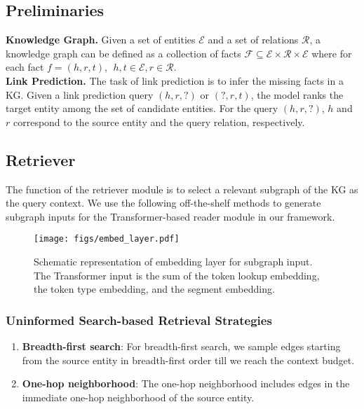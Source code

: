 \subsection{Preliminaries}
\noindent \textbf{Knowledge Graph.} Given a set of entities $\mathcal{E}$ and a set of relations $\mathcal{R}$, a knowledge graph can be defined as a collection of facts $\mathcal{F} \subseteq \mathcal{E} \times \mathcal{R} \times \mathcal{E}$ where for each fact $f = (h, r, t)$, $\;h,t \in \mathcal{E}, r \in \mathcal{R}$.\\

\noindent \textbf{Link Prediction.} The task of link prediction is to infer the missing facts in a KG\@. Given a link prediction query $(h, r, ?)$ or $(?, r, t)$, the model ranks the target entity among the set of candidate entities. For the query $(h, r, ?)$, $h$ and $r$ correspond to the source entity and the query relation, respectively.
\subsection{Retriever}
The function of the retriever module is to select a relevant subgraph of the KG as the query context.
We use the following off-the-shelf methods to generate subgraph inputs for the Transformer-based reader module in our framework.

\begin{figure*}[htbp]
  \centering
  \texttt{[image: figs/embed\_layer.pdf]}
  \caption{Schematic representation of embedding layer for subgraph input. The Transformer input is the sum of the token lookup embedding, the token type embedding, and the segment embedding.}
  \label{fig:model_embed}
\end{figure*}

\subsubsection{Uninformed Search-based Retrieval Strategies}
\begin{enumerate}[label=\alph*)]
\item\textbf{Breadth-first search}: For breadth-first search, we sample edges starting from the source entity in breadth-first order till we reach the context budget.
\item\textbf{One-hop neighborhood}: The one-hop neighborhood includes edges in the immediate one-hop neighborhood of the source entity.
\end{enumerate}

